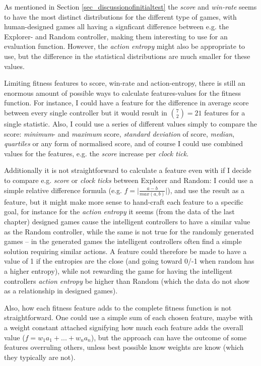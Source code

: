 \documentclass[a4paper,titlepage,final]{report}
\begin{document}
As mentioned in Section \ref{sec_discussionofinitialtest} the \textit{score} and \textit{win-rate} seems to have the most distinct distributions for the different type of games, with human-designed games all having a signficant difference between e.g. the Explorer- and Random controller, making them interesting to use for an evaluation function.
However, the \textit{action entropy} might also be appropriate to use, but the difference in the statistical distributions are much smaller for these values.

Limiting fitness features to score, win-rate and action-entropy, there is still an enormous amount of possible ways to calculate features-values for the fitness function.
For instance, I could have a feature for the difference in average score between every single controller but it would result in $\binom{7}{2}=21$ features for a single statistic.
Also, I could use a series of different values simply to compare the score: \textit{minimum}- and \textit{maximum} score, \textit{standard deviation} of score, \textit{median}, \textit{quartiles} or any form of normalised score, and of course I could  use combined values for the features, e.g. the \textit{score} increase per \textit{clock tick}.

Additionally it is not straightforward to calculate a feature even with if I decide to compare e.g. \textit{score} or \textit{clock ticks} between Explorer and Random:
I could use a simple relative difference formula (e.g. $f=\lvert\frac{a-b}{max(a,b)}\rvert$), and use the result as a feature, but it might make more sense to hand-craft each feature to a specific goal, for instance for the \textit{action entropy} it seems (from the data of the last chapter) designed games cause the intelligent controllers to have a similar value as the Random controller, while the same is not true for the randomly generated games -- in the generated games the intelligent controllers often find a simple solution requiring similar actions.
A feature could therefore be made to have a value of 1 if the entropies are the close (and going toward 0/-1 when random has a higher entropy), while not rewarding the game for having the intelligent controllers \textit{action entropy} be higher than Random (which the data do not show as a relationship in designed games).

Also, how each fitness feature adds to the complete fitness function is not straightforward.
One could use a simple sum of each chosen feature, maybe with a weight constant attached signifying how much each feature adds the overall value ($f = w_1a_1+...+w_na_n$), but the approach can have the outcome of some features overruling others, unless best possible know weights are know (which they typically are not).
\end{document}
